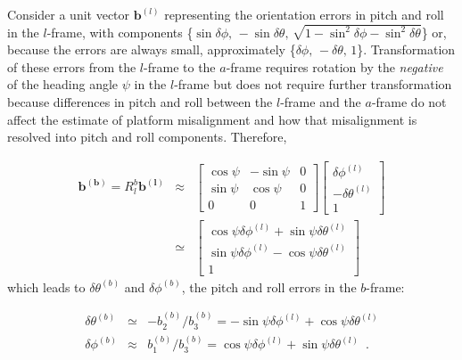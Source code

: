\documentclass[12pt,twoside,english]{article}\usepackage[]{graphicx}\usepackage[]{color}
\begin{document}
{{Consider a unit vector $\mathbf{b}^{(l)}$ representing the orientation errors in pitch and roll in the $l$-frame, with components \{$\sin\delta\phi,\,-\sin\delta\theta,\,\sqrt{1-\sin^{2}\delta\phi-\sin^{2}\delta\theta}$\} or, because the errors are always small, approximately \{$\delta\phi,\,-\delta\theta,\,1$\}. Transformation of these errors from the $l$-frame to the $a$-frame requires rotation by the \emph{negative} of
the heading angle $\psi$ in the $l$-frame but does not require further transformation because
differences in pitch and roll between the $l$-frame and the $a$-frame do not affect the estimate of platform misalignment and how that misalignment is resolved into pitch and roll components. Therefore,

\begin{eqnarray}
\mathbf{b^{(b)}=}R_{l}^{b}\mathbf{b^{(l)}} & \approx & \left[\begin{array}{ccc}
\cos\psi & -\sin\psi & 0\\
\sin\psi & \cos\psi & 0\\
0 & 0 & 1
\end{array}\right]\begin{bmatrix}\delta\phi^{(l)}\\
-\delta\theta^{(l)}\\
1
\end{bmatrix}\label{eq:b-vector-in-b-frame}\\
 & \simeq & \begin{bmatrix}\cos\psi\delta\phi^{(l)}+\sin\psi\delta\theta^{(l)}\\
\sin\psi\delta\phi^{(l)}-\cos\psi\delta\theta^{(l)}\\
1
\end{bmatrix}
\end{eqnarray}
which leads to $\delta\theta^{(b)}$ and $\delta\phi^{(b)}$, the
pitch and roll errors in the $b$-frame:

\begin{eqnarray}
\delta\theta^{(b)} & \simeq & -b_{2}^{(b)}/b_{3}^{(b)}=-\sin\psi\delta\phi^{(l)}+\cos\psi\delta\theta^{(l)}\label{eq:final-answer}\\
\delta\phi^{(b)} & \approx & b_{1}^{(b)}/b_{3}^{(b)}=\cos\psi\delta\phi^{(l)}+\sin\psi\delta\theta^{(l)}\,\,\,.\nonumber 
\end{eqnarray}

}}
\end{document}
